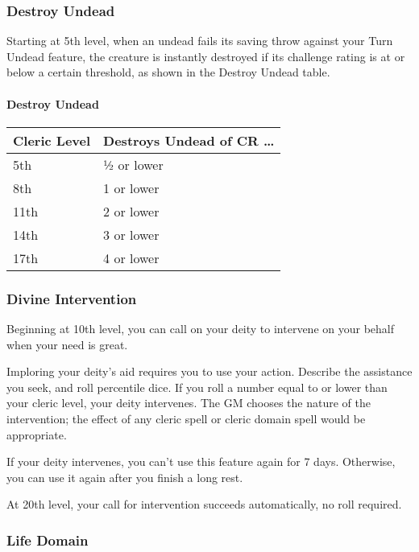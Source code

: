 \documentclass[
]{article}
\begin{document}
\hypertarget{destroy-undead}{%
\subsubsection{Destroy Undead}\label{destroy-undead}}

Starting at 5th level, when an undead fails its saving throw against
your Turn Undead feature, the creature is instantly destroyed if its
challenge rating is at or below a certain threshold, as shown in the
Destroy Undead table.

\hypertarget{destroy-undead-1}{%
\paragraph{Destroy Undead}\label{destroy-undead-1}}

\begin{longtable}[]{@{}ll@{}}
\toprule
Cleric Level & Destroys Undead of CR \ldots{}\tabularnewline
\midrule
\endhead
5th & ½ or lower\tabularnewline
8th & 1 or lower\tabularnewline
11th & 2 or lower\tabularnewline
14th & 3 or lower\tabularnewline
17th & 4 or lower\tabularnewline
\bottomrule
\end{longtable}

\hypertarget{divine-intervention}{%
\subsubsection{Divine Intervention}\label{divine-intervention}}

Beginning at 10th level, you can call on your deity to intervene on your
behalf when your need is great.

Imploring your deity's aid requires you to use your action. Describe the
assistance you seek, and roll percentile dice. If you roll a number
equal to or lower than your cleric level, your deity intervenes. The GM
chooses the nature of the intervention; the effect of any cleric spell
or cleric domain spell would be appropriate.

If your deity intervenes, you can't use this feature again for 7 days.
Otherwise, you can use it again after you finish a long rest.

At 20th level, your call for intervention succeeds automatically, no
roll required.

\hypertarget{life-domain}{%
\subsubsection{Life Domain}\label{life-domain}}
\end{document}
